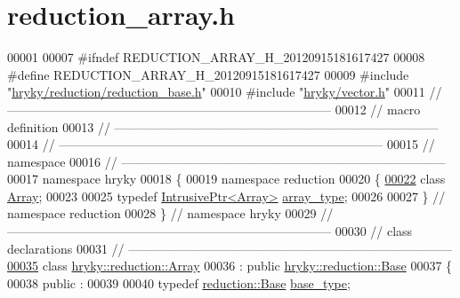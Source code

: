 \hypertarget{reduction__array_8h_source}{\section{reduction\-\_\-array.\-h}
}

\begin{DoxyCode}
00001 
00007 \textcolor{preprocessor}{#ifndef REDUCTION\_ARRAY\_H\_20120915181617427}
00008 \textcolor{preprocessor}{}\textcolor{preprocessor}{#define REDUCTION\_ARRAY\_H\_20120915181617427}
00009 \textcolor{preprocessor}{}\textcolor{preprocessor}{#include "\hyperlink{reduction__base_8h}{hryky/reduction/reduction_base.h}"}
00010 \textcolor{preprocessor}{#include "\hyperlink{vector_8h}{hryky/vector.h}"}
00011 \textcolor{comment}{//
      ------------------------------------------------------------------------------}
00012 \textcolor{comment}{// macro definition}
00013 \textcolor{comment}{//
      ------------------------------------------------------------------------------}
00014 \textcolor{comment}{//
      ------------------------------------------------------------------------------}
00015 \textcolor{comment}{// namespace}
00016 \textcolor{comment}{//
      ------------------------------------------------------------------------------}
00017 \textcolor{keyword}{namespace }hryky
00018 \{
00019 \textcolor{keyword}{namespace }reduction
00020 \{
\hypertarget{reduction__array_8h_source_l00022}{}\hyperlink{namespacehryky_1_1reduction_ad7a80870a94be0b91740690d01a72d4d}{00022}     \textcolor{keyword}{class }\hyperlink{classhryky_1_1reduction_1_1_array}{Array};
00023 
00025     \textcolor{keyword}{typedef} \hyperlink{classhryky_1_1_intrusive_ptr}{IntrusivePtr<Array>} \hyperlink{namespacehryky_1_1reduction_ad7a80870a94be0b91740690d01a72d4d}{array_type};
00026 
00027 \} \textcolor{comment}{// namespace reduction}
00028 \} \textcolor{comment}{// namespace hryky}
00029 \textcolor{comment}{//
      ------------------------------------------------------------------------------}
00030 \textcolor{comment}{// class declarations}
00031 \textcolor{comment}{//
      ------------------------------------------------------------------------------}
\hypertarget{reduction__array_8h_source_l00035}{}\hyperlink{classhryky_1_1reduction_1_1_array}{00035} \textcolor{comment}{}\textcolor{keyword}{class }\hyperlink{classhryky_1_1reduction_1_1_array}{hryky::reduction::Array}
00036     : \textcolor{keyword}{public} \hyperlink{classhryky_1_1reduction_1_1_base}{hryky::reduction::Base}
00037 \{
00038 \textcolor{keyword}{public} :
00039 
00040     \textcolor{keyword}{typedef}                         \hyperlink{classhryky_1_1reduction_1_1_base}{reduction::Base} \hyperlink{classhryky_1_1reduction_1_1_base}{base_type};

\end{DoxyCode}
